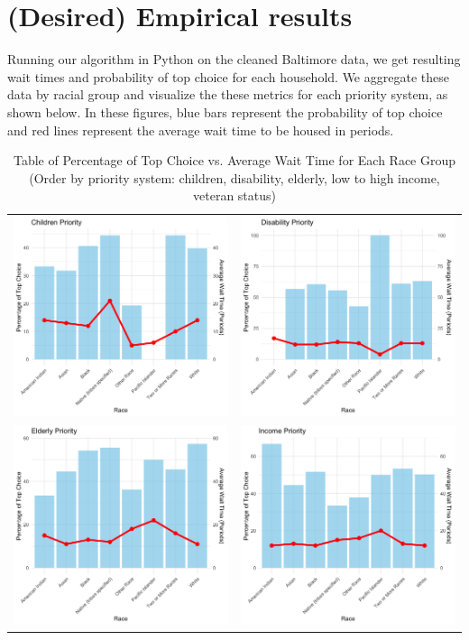 \documentclass[11pt]{article}
\begin{document}
\newpage
\section{(Desired) Empirical results}
Running our algorithm in Python on the cleaned Baltimore data, we get resulting wait times and probability of top choice for each household. We aggregate these data by racial group and visualize the these metrics for each priority system, as shown below. In these figures, blue bars represent the probability of top choice and red lines represent the average wait time to be housed in periods.
        \begin{table}[h]
            \centering
                \caption{Table of Percentage of Top Choice vs. Average Wait Time for Each Race Group \\
                (Order by priority system: children, disability, elderly, low to high income, veteran status)}
                \vspace{1.1em}
                \begin{tabular}{cc}
                    \includegraphics[width=0.33\linewidth]{Children.png}
                    & \includegraphics[width=0.33\linewidth]{Disability.png} \\[-4pt]
                    \includegraphics[width=0.33\linewidth]{Elderly.png} & \includegraphics[width=0.33\linewidth]{Income.png} 
                \end{tabular}%
        \end{table}
\end{document}
